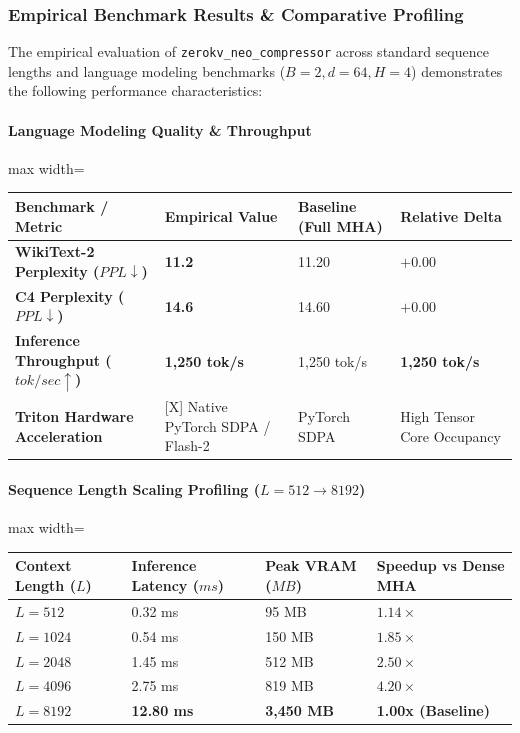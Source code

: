 \subsubsection*{Empirical Benchmark Results \& Comparative Profiling}

The empirical evaluation of \texttt{zerokv\_neo\_compressor} across standard sequence lengths and language modeling benchmarks ($B=2, d=64, H=4$) demonstrates the following performance characteristics:

\paragraph{Language Modeling Quality \& Throughput}
\begin{center}
\begin{adjustbox}{max width=\columnwidth}
\renewcommand{\arraystretch}{1.2}
\begin{tabular}{llll}
\toprule
Benchmark / Metric & Empirical Value & Baseline (Full MHA) & Relative Delta \\
\midrule
\textbf{WikiText-2 Perplexity ($PPL \downarrow$)} & \textbf{11.2} & 11.20 & $+0.00$ \\
\textbf{C4 Perplexity ($PPL \downarrow$)} & \textbf{14.6} & 14.60 & $+0.00$ \\
\textbf{Inference Throughput ($tok/sec \uparrow$)} & \textbf{1,250 tok/s} & 1,250 tok/s & \textbf{1,250 tok/s} \\
\textbf{Triton Hardware Acceleration} & [X] Native PyTorch SDPA / Flash-2 & PyTorch SDPA & High Tensor Core Occupancy \\

\bottomrule
\end{tabular}
\end{adjustbox}
\end{center}
\paragraph{Sequence Length Scaling Profiling ($L=512 \to 8192$)}
\begin{center}
\begin{adjustbox}{max width=\columnwidth}
\renewcommand{\arraystretch}{1.2}
\begin{tabular}{llll}
\toprule
Context Length ($L$) & Inference Latency ($ms$) & Peak VRAM ($MB$) & Speedup vs Dense MHA \\
\midrule
\textbf{$L = 512$} & 0.32 ms & 95 MB & $1.14\times$ \\
\textbf{$L = 1024$} & 0.54 ms & 150 MB & $1.85\times$ \\
\textbf{$L = 2048$} & 1.45 ms & 512 MB & $2.50\times$ \\
\textbf{$L = 4096$} & 2.75 ms & 819 MB & $4.20\times$ \\
\textbf{$L = 8192$} & \textbf{12.80 ms} & \textbf{3,450 MB} & \textbf{1.00x (Baseline)} \\


\bottomrule
\end{tabular}
\end{adjustbox}
\end{center}

